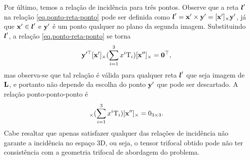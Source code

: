Por último, temos a relação de incidência para três pontos. 
Observe que a reta $\boldsymbol{l}'$ na relação \ref{eq.ponto-reta-ponto} pode ser definida como $\boldsymbol{l}'=\mathbf{x}'\times {\bf y}'=[\mathbf{x}']_\times {\bf y}'$, já que $\mathbf{x}'\in\boldsymbol{l}'$ e ${\bf y}'$ é um ponto qualquer no plano da segunda imagem. Substituindo $\boldsymbol{l}'$, a relação \ref{eq.ponto-reta-ponto} se torna 
\begin{equation*}
{\bf y}'^\top[\mathbf{x}']_\times(\sum_{i=1}^3 x^i\mbox{T}_i)[\mathbf{x}'']_\times={\bf 0}^\top,
\end{equation*}
mas observa-se que tal relação é válida para qualquer reta $\boldsymbol{l}'$ que seja imagem de ${\bf L}$, e portanto não depende da escolha do ponto ${\bf y}'$ que pode ser descartado. A relação ponto-ponto-ponto é
\begin{equation*}
[\x']_\times(\sum_{i=1}^3 x^i\mbox{T}_i)[\x'']_\times=0_{3\times3}.
\end{equation*}
Cabe resaltar que apenas satisfazer qualquer das relações de incidência não garante a incidência no espaço 3D, ou seja, o tensor trifocal obtido pode não ter consistência com a geometria trifocal de abordagem do problema.

